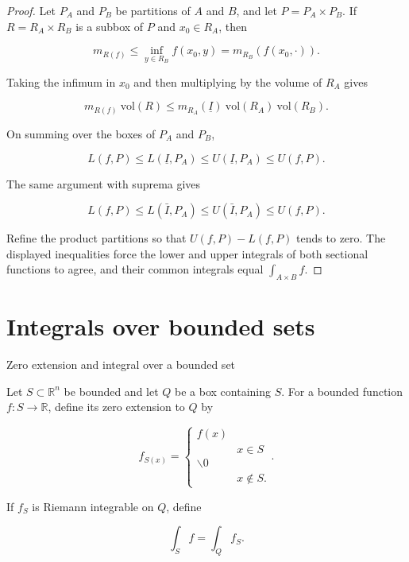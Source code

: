 \begin{proof}

Let \(P_{A}\) and \(P_{B}\) be partitions of \(A\) and \(B\), and let \(P = P_{A} \times P_{B}\). If \(R = R_{A} \times R_{B}\) is a subbox of \(P\) and \(x_{0} \in R_{A}\), then

\[m_{R{(f)}} \leq \inf\limits_{y \in R_{B}}f\left( {x_{0},y} \right) = m_{R_{B}}\left( {f\left( {x_{0}, \cdot} \right)} \right).\]

Taking the infimum in \(x_{0}\) and then multiplying by the volume of \(R_{A}\) gives

\[m_{R{(f)}}\ \text{vol}(R) \leq m_{R_{A}}\left( \underline{I} \right)\ \text{vol}\left( R_{A} \right)\ \text{vol}\left( R_{B} \right).\]

On summing over the boxes of \(P_{A}\) and \(P_{B}\),

\[L\left( {f,P} \right) \leq L\left( {\underline{I},P_{A}} \right) \leq U\left( {\underline{I},P_{A}} \right) \leq U\left( {f,P} \right).\]

The same argument with suprema gives

\[L\left( {f,P} \right) \leq L\left( {\bar{I},P_{A}} \right) \leq U\left( {\bar{I},P_{A}} \right) \leq U\left( {f,P} \right).\]

Refine the product partitions so that \(U\left( {f,P} \right) - L\left( {f,P} \right)\) tends to zero. The displayed inequalities force the lower and upper integrals of both sectional functions to agree, and their common integrals equal \(\int_{A \times B}f\).

\end{proof}

\section{Integrals over bounded sets}

\begin{definition}{Zero extension and integral over a bounded set}

Let \(S \subset \mathbb{R}^{n}\) be bounded and let \(Q\) be a box containing \(S\). For a bounded function \(f:S\rightarrow\mathbb{R}\), define its zero extension to \(Q\) by

\[f_{S{(x)}} = \left\{ \begin{matrix}
{f(x)} & \\
 & {x \in S} \\
{\backslash 0} & \\
 & {x \notin S.}
\end{matrix} \right..\]

If \(f_{S}\) is Riemann integrable on \(Q\), define

\[\int_{S}f = \int_{Q}f_{S}.\]

\end{definition}

